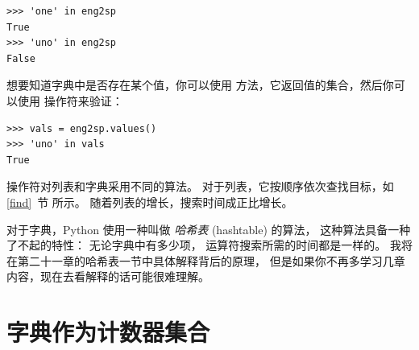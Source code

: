   

\begin{lstlisting}
>>> 'one' in eng2sp
True
>>> 'uno' in eng2sp
False
\end{lstlisting}

%

想要知道字典中是否存在某个值，你可以使用  方法，它返回值的集合，然后你可以使用  操作符来验证：

  

\begin{lstlisting}
>>> vals = eng2sp.values()
>>> 'uno' in vals
True
\end{lstlisting}

%

 操作符对列表和字典采用不同的算法。
对于列表，它按顺序依次查找目标，如 \ref{find}~节 所示。
随着列表的增长，搜索时间成正比增长。


对于字典，Python 使用一种叫做 {\em 哈希表} (hashtable) 的算法，
这种算法具备一种了不起的特性： 无论字典中有多少项，  运算符搜索所需的时间都是一样的。 我将在第二十一章的哈希表一节中具体解释背后的原理，
但是如果你不再多学习几章内容，现在去看解释的话可能很难理解。

\section{字典作为计数器集合}
\label{histogram}

